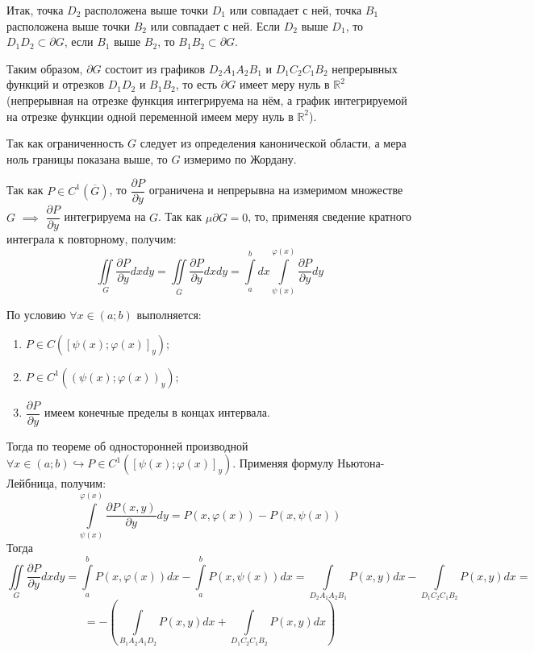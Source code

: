 \documentclass[12pt, a4paper, reqno]{article}
\begin{document}
    Итак, точка $D_2$ расположена выше точки $D_1$ или совпадает с ней, точка $B_1$ расположена выше
    точки $B_2$ или совпадает с ней. Если $D_2$ выше $D_1$, то $D_1D_2 \subset \partial G$, если
    $B_1$ выше $B_2$, то $B_1B_2 \subset \partial G$.

    Таким образом, $\partial G$ состоит из графиков $D_2A_1A_2B_1$ и $D_1C_2C_1B_2$ непрерывных
    функций и отрезков $D_1D_2$ и $B_1B_2$, то есть $\partial G$ имеет меру нуль в $\mathbb{R}^2$
    (непрерывная на отрезке функция интегрируема на нём, а график интегрируемой на отрезке функции
     одной переменной имеем меру нуль в $\mathbb{R}^2$).

    Так как ограниченность $G$ следует из определения канонической области, а мера ноль границы
    показана выше, то $G$ измеримо по Жордану.

    Так как $P \in C^1(\overline{G})$, то $\dfrac{\partial P}{\partial y}$ ограничена и непрерывна
    на измеримом множестве $G$ $\implies$ $\dfrac{\partial P}{\partial y}$ интегрируема на $G$.
    Так как $\mu\partial G = 0$, то, применяя сведение кратного интеграла к повторному, получим:
    \begin{equation*}
        \iint\limits_{G}\frac{\partial P}{\partial y}dxdy =
        \iint\limits_{\overline{G}}\frac{\partial P}{\partial y}dxdy =
        \int\limits_{a}^{b}dx \int\limits_{\psi(x)}^{\varphi(x)} \frac{\partial P}{\partial y}dy
    \end{equation*}

    По условию $\forall x \in (a; b)$ выполняется:
    \begin{enumerate}
        \item $P \in C([\psi(x); \varphi(x)]_y);$
        \item $P \in C^1((\psi(x); \varphi(x))_y);$
        \item $\dfrac{\partial P}{\partial y}$ имеем конечные пределы в концах интервала.
    \end{enumerate}

    Тогда по теореме об односторонней производной
    $\forall x \in (a; b) \hookrightarrow P \in C^1([\psi(x); \varphi(x)]_y)$.
    Применяя формулу Ньютона-Лейбница, получим:
    \begin{equation*}
        \int\limits_{\psi(x)}^{\varphi(x)}\frac{\partial P(x, y)}{\partial y}dy =
        P(x, \varphi(x)) - P(x, \psi(x))
    \end{equation*}
    Тогда
    \begin{equation*}
        \iint\limits_{G}\frac{\partial P}{\partial y}dxdy =
        \int\limits_{a}^{b} P(x, \varphi(x))dx - \int\limits_{a}^{b} P(x, \psi(x))dx =
        \int\limits_{D_2A_1A_2B_1} P(x, y)dx - \int\limits_{D_1C_2C_1B_2} P(x, y)dx =
    \end{equation*}
    \begin{equation*}
        = -\left(\int\limits_{B_1A_2A_1D_2} P(x, y)dx + \int\limits_{D_1C_2C_1B_2} P(x, y)dx\right)
    \end{equation*}
\end{document}
